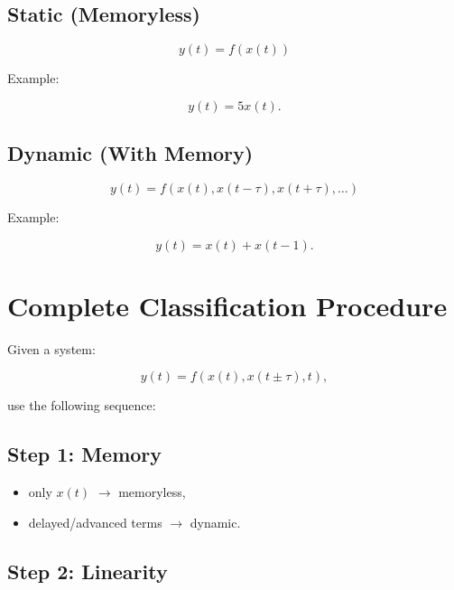 
\subsection{Static (Memoryless)}

\[
y(t)=f(x(t))
\]

Example:

\[
y(t)=5x(t).
\]


\subsection{Dynamic (With Memory)}

\[
y(t)=f(x(t),x(t-\tau),x(t+\tau),\ldots)
\]

Example:

\[
y(t)=x(t)+x(t-1).
\]


\section{Complete Classification Procedure}

Given a system:

\[
y(t)=f(x(t),x(t\pm\tau),t),
\]

use the following sequence:


\subsection{Step 1: Memory}

\begin{itemize}
\item only \(x(t)\) \(\rightarrow\) memoryless,
\item delayed/advanced terms \(\rightarrow\) dynamic.
\end{itemize}


\subsection{Step 2: Linearity}

